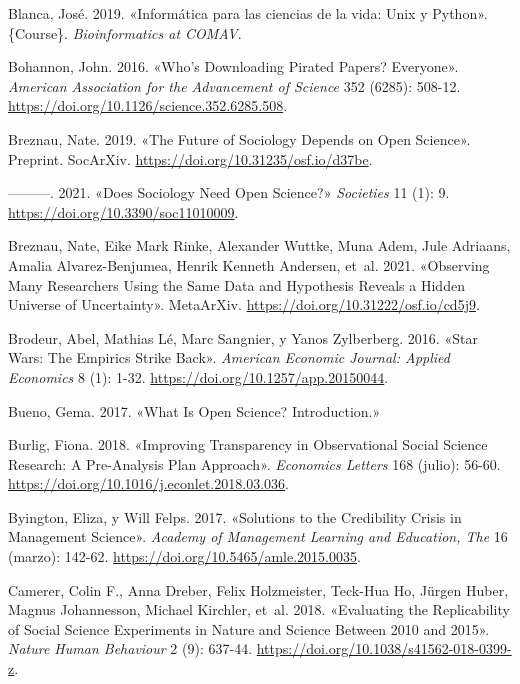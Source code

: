 \documentclass[
  spanish,
  letterpaper,
  DIV=11,
  numbers=noendperiod]{scrreprt}
\newlength{\cslhangindent}
\newenvironment{CSLReferences}[2] %
 {\begin{list}{}{%
  \setlength{\itemindent}{0pt}
  \setlength{\leftmargin}{0pt}
  \setlength{\parsep}{0pt}
  \ifodd #1
   \setlength{\leftmargin}{\cslhangindent}
   \setlength{\itemindent}{-1\cslhangindent}
  \fi
  \setlength{\itemsep}{#2\baselineskip}}}
 {\end{list}}
\begin{document}
\begin{CSLReferences}{1}{0}
Blanca, José. 2019. {«{Inform{á}tica para las ciencias de la vida: Unix
y Python}»}. \{Course\}. \emph{Bioinformatics at COMAV}.

Bohannon, John. 2016. {«Who's Downloading Pirated Papers? {Everyone}»}.
\emph{American Association for the Advancement of Science} 352 (6285):
508-12. \url{https://doi.org/10.1126/science.352.6285.508}.

Breznau, Nate. 2019. {«The {Future} of {Sociology Depends} on {Open
Science}»}. Preprint. SocArXiv.
\url{https://doi.org/10.31235/osf.io/d37be}.

---------. 2021. {«Does {Sociology Need Open Science}?»}
\emph{Societies} 11 (1): 9. \url{https://doi.org/10.3390/soc11010009}.

Breznau, Nate, Eike Mark Rinke, Alexander Wuttke, Muna Adem, Jule
Adriaans, Amalia Alvarez-Benjumea, Henrik Kenneth Andersen, et~al. 2021.
{«Observing {Many Researchers Using} the {Same Data} and {Hypothesis
Reveals} a {Hidden Universe} of {Uncertainty}»}. MetaArXiv.
\url{https://doi.org/10.31222/osf.io/cd5j9}.

Brodeur, Abel, Mathias Lé, Marc Sangnier, y Yanos Zylberberg. 2016.
{«Star {Wars}: {The Empirics Strike Back}»}. \emph{American Economic
Journal: Applied Economics} 8 (1): 1-32.
\url{https://doi.org/10.1257/app.20150044}.

Bueno, Gema. 2017. {«What {Is Open Science}? {Introduction}.»}

Burlig, Fiona. 2018. {«Improving Transparency in Observational Social
Science Research: {A} Pre-Analysis Plan Approach»}. \emph{Economics
Letters} 168 (julio): 56-60.
\url{https://doi.org/10.1016/j.econlet.2018.03.036}.

Byington, Eliza, y Will Felps. 2017. {«Solutions to the {Credibility
Crisis} in {Management Science}»}. \emph{Academy of Management Learning
and Education, The} 16 (marzo): 142-62.
\url{https://doi.org/10.5465/amle.2015.0035}.

Camerer, Colin F., Anna Dreber, Felix Holzmeister, Teck-Hua Ho, Jürgen
Huber, Magnus Johannesson, Michael Kirchler, et~al. 2018. {«Evaluating
the Replicability of Social Science Experiments in {Nature} and
{Science} Between 2010 and 2015»}. \emph{Nature Human Behaviour} 2 (9):
637-44. \url{https://doi.org/10.1038/s41562-018-0399-z}.


\end{CSLReferences}
\end{document}
